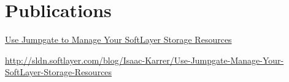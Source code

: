 \documentclass[letterpaper]{resume} %
\begin{document}
\begin{minipage}[t]{0.66\textwidth}
\sectionspace %


\section{Publications}
\href{http://sldn.softlayer.com/blog/Isaac-Karrer/Use-Jumpgate-Manage-Your-SoftLayer-Storage-Resources}{Use Jumpgate to Manage Your SoftLayer Storage Resources}

\footnotesize
\href{http://sldn.softlayer.com/blog/Isaac-Karrer/Use-Jumpgate-Manage-Your-SoftLayer-Storage-Resources}{http://sldn.softlayer.com/blog/Isaac-Karrer/Use-Jumpgate-Manage-Your-SoftLayer-Storage-Resources}
 
\sectionspace

\end{minipage} %








\end{document}
